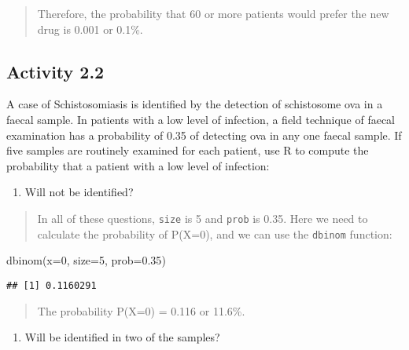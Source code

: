 \documentclass[
]{memoir}
\newenvironment{Shaded}{\begin{snugshade}}{\end{snugshade}}
\newcommand{\AttributeTok}[1]{\textcolor[rgb]{0.77,0.63,0.00}{#1}}
\newcommand{\DecValTok}[1]{\textcolor[rgb]{0.00,0.00,0.81}{#1}}
\newcommand{\FloatTok}[1]{\textcolor[rgb]{0.00,0.00,0.81}{#1}}
\newcommand{\FunctionTok}[1]{\textcolor[rgb]{0.00,0.00,0.00}{#1}}
\newcommand{\NormalTok}[1]{#1}
\providecommand{\tightlist}{%
  \setlength{\itemsep}{0pt}\setlength{\parskip}{0pt}}
\begin{document}
\begin{quote}
Therefore, the probability that 60 or more patients would prefer the new drug is 0.001 or 0.1\%.
\end{quote}

\hypertarget{activity-2.2}{%
\subsection*{Activity 2.2}\label{activity-2.2}}

A case of Schistosomiasis is identified by the detection of schistosome ova in a faecal sample. In patients with a low level of infection, a field technique of faecal examination has a probability of 0.35 of detecting ova in any one faecal sample. If five samples are routinely examined for each patient, use R to compute the probability that a patient with a low level of infection:

\begin{enumerate}
\def\labelenumi{\alph{enumi})}
\tightlist
\item
  Will not be identified?
\end{enumerate}

\begin{quote}
In all of these questions, \texttt{size} is 5 and \texttt{prob} is 0.35. Here we need to calculate the probability of P(X=0), and we can use the \texttt{dbinom} function:
\end{quote}

\begin{Shaded}
\begin{Highlighting}[]
\FunctionTok{dbinom}\NormalTok{(}\AttributeTok{x=}\DecValTok{0}\NormalTok{, }\AttributeTok{size=}\DecValTok{5}\NormalTok{, }\AttributeTok{prob=}\FloatTok{0.35}\NormalTok{)}
\end{Highlighting}
\end{Shaded}

\begin{verbatim}
## [1] 0.1160291
\end{verbatim}

\begin{quote}
The probability P(X=0) = 0.116 or 11.6\%.
\end{quote}

\begin{enumerate}
\def\labelenumi{\alph{enumi})}
\setcounter{enumi}{1}
\tightlist
\item
  Will be identified in two of the samples?
\end{enumerate}
\end{document}
